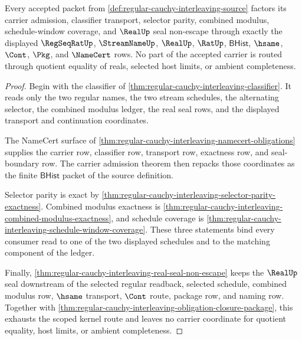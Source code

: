 \begin{theorem}
\label{thm:regular-cauchy-interleaving-scoped-kernel-route}
Every accepted packet from \autoref{def:regular-cauchy-interleaving-source} factors its carrier admission, classifier transport, selector parity, combined modulus, schedule-window coverage, and $\RealUp$ seal non-escape through exactly the displayed $\RegSeqRatUp$, $\StreamNameUp$, $\RealUp$, $\RatUp$, $\mathsf{BHist}$, $\hsame$, $\Cont$, $\Pkg$, and $\NameCert$ rows. No part of the accepted carrier is routed through quotient equality of reals, selected host limits, or ambient completeness.
\end{theorem}
\begin{proof}
Begin with the classifier of \autoref{thm:regular-cauchy-interleaving-classifier}. It reads only the two regular names, the two stream schedules, the alternating selector, the combined modulus ledger, the real seal rows, and the displayed transport and continuation coordinates.

The NameCert surface of \autoref{thm:regular-cauchy-interleaving-namecert-obligations} supplies the carrier row, classifier row, transport row, exactness row, and seal-boundary row. The carrier admission theorem then repacks those coordinates as the finite $\mathsf{BHist}$ packet of the source definition.

Selector parity is exact by \autoref{thm:regular-cauchy-interleaving-selector-parity-exactness}. Combined modulus exactness is \autoref{thm:regular-cauchy-interleaving-combined-modulus-exactness}, and schedule coverage is \autoref{thm:regular-cauchy-interleaving-schedule-window-coverage}. These three statements bind every consumer read to one of the two displayed schedules and to the matching component of the ledger.

Finally, \autoref{thm:regular-cauchy-interleaving-real-seal-non-escape} keeps the $\RealUp$ seal downstream of the selected regular readback, selected schedule, combined modulus row, $\hsame$ transport, $\Cont$ route, package row, and naming row. Together with \autoref{thm:regular-cauchy-interleaving-obligation-closure-package}, this exhausts the scoped kernel route and leaves no carrier coordinate for quotient equality, host limits, or ambient completeness.
\end{proof}

